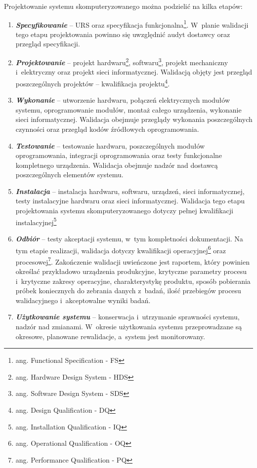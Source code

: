 \documentclass[brudnopis]{xmgr}
\begin{document}
\textcolor{sb}{Projektowanie systemu skomputeryzowanego można podzielić na kilka etapów:}

\begin{enumerate}
  \item \textbf{\textit{Specyfikowanie}} – \textcolor{sa}{URS oraz specyfikacja funkcjonalna\footnote{ang. Functional Specification - FS}. W~planie walidacji tego etapu projektowania powinno się uwzględnić audyt dostawcy oraz przegląd specyfikacji.}
  \item \textbf{\textit{Projektowanie}} – \textcolor{sa}{projekt hardwaru\footnote{ang. Hardware Design System - HDS}, softwaru\footnote{ang. Software Design System - SDS}, projekt mechaniczny i~elektryczny oraz projekt sieci informatycznej. Walidacją objęty jest przegląd poszczególnych projektów – kwalifikacja projektu\footnote{ang. Design Qualification - DQ}.}
  \item \textbf{\textit{Wykonanie}} – \textcolor{sa}{utworzenie hardwaru, połączeń elektrycznych modułów systemu, oprogramowanie modułów, montaż całego urządzenia, wykonanie sieci informatycznej. Walidacja obejmuje przeglądy wykonania poszczególnych czynności oraz przegląd kodów źródłowych oprogramowania.}
\item \textbf{\textit{Testowanie}} – \textcolor{sa}{testowanie hardwaru, poszczególnych modułów oprogramowania,  integracji oprogramowania oraz testy funkcjonalne kompletnego urządzenia. Walidacja obejmuje nadzór nad dostawcą poszczególnych elementów systemu.}
\item \textbf{\textit{Instalacja}} – \textcolor{sa}{instalacja hardwaru, softwaru, urządzeń, sieci informatycznej, testy instalacyjne hardwaru oraz sieci informatycznej. Walidacja tego etapu projektowania systemu skomputeryzowanego dotyczy pełnej kwalifikacji instalacyjnej\footnote{ang. Installation Qualification - IQ}}
\item \textbf{\textit{Odbiór}} – \textcolor{sa}{testy akceptacji systemu, w~tym kompletności dokumentacji. Na tym etapie realizacji, walidacja dotyczy kwalifikacji operacyjnej\footnote{ang. Operational Qualification - OQ} oraz procesowej\footnote{ang. Performance Qualification - PQ}. Zakończenie walidacji uwieńczone jest raportem, który powinien określać przykładowo urządzenia produkcyjne, krytyczne parametry procesu i~krytyczne zakresy operacyjne, charakterystykę produktu, sposób pobierania próbek koniecznych do zebrania danych z~badań, ilość przebiegów procesu walidacyjnego i~akceptowalne wyniki badań.}
\item \textbf{\textit{Użytkowanie systemu}} – \textcolor{sa}{konserwacja i~utrzymanie sprawności systemu, nadzór nad zmianami. W~okresie użytkowania systemu przeprowadzane są okresowe, planowane rewalidacje, a~system jest monitorowany.\cite{LAB-EL2}}
\end{enumerate}
\end{document}
